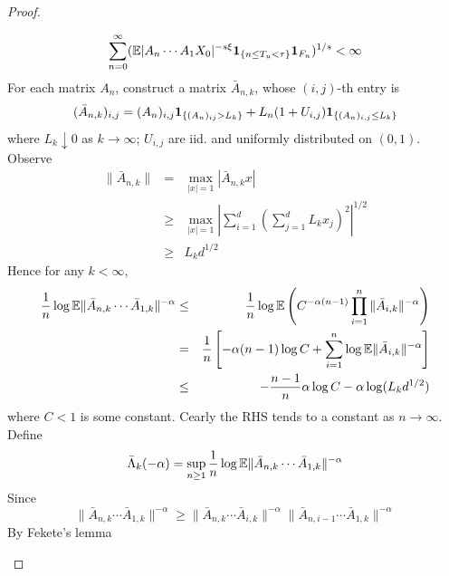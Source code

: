 \documentclass{article}
\theoremstyle{remark}
\begin{document}
\begin{proof}
\begin{enumerate}
    \begin{equation}
      \label{eq:sum_on_F_n}
      \sum_{n=0}^\infty
      (\mathbb{E} |A_n \cdots A_1 X_0|^{-s\xi}\mathbf{1}_{\{n \leq T_u < \tau\}}
      \mathbf{1}_{F_n})^{1/s} < \infty
    \end{equation}
    For each matrix $A_n$, construct a matrix $\bar A_{n, k}$, whose
    $(i,j)$-th entry is
    \begin{equation*}
      (\bar A_{n,k})_{i,j} = (A_n)_{i,j}\mathbf{1}_{\{(A_n)_{ij} > L_k\}} +
      L_n (1 + U_{i,j})\mathbf{1}_{\{(A_n)_{i,j} \leq L_k\}}
    \end{equation*}
    where $L_k \downarrow 0$ as $k \to \infty$; $U_{i,j}$ are
    iid. and uniformly distributed on $(0,1)$.
    Observe
    \begin{eqnarray*}
      \|\bar A_{n,k}\|
      &=&
      \max_{|x| = 1} |\bar A_{n,k} x| \\
      &\geq&
      \max_{|x| = 1}
      \left|
        \sum_{i=1}^d \left(\sum_{j=1}^d L_k x_j \right)^2
      \right|^{1/2} \\
      &\geq& L_k d^{1/2}
    \end{eqnarray*}
    Hence for any $k < \infty$,
    \begin{eqnarray*}
      {1 \over n}
      \log \mathbb{E}
      \|\bar A_{n,k} \cdots \bar A_{1,k}\|^{-\alpha}
      &\leq&
             {1 \over n} \log \mathbb{E} \left(
             C^{-\alpha(n-1)} \prod_{i=1}^n \|\bar A_{i,k}\|^{-\alpha}
             \right) \\
      &=& {1 \over n} \left[
          -\alpha(n-1) \log C
          + \sum_{i=1}^n \log \mathbb{E} \|\bar A_{i,k}\|^{-\alpha}
          \right] \\
      &\leq&
          -{n - 1 \over n} \alpha \log C
          -\alpha \log (L_k d^{1/2})
    \end{eqnarray*}
    where $C < 1$ is some constant. Cearly the RHS tends to a constant
    as $n \to \infty$. Define
    \begin{equation*}
      \bar \Lambda_{k}(-\alpha) = \sup_{n \geq 1} {1 \over n} \log
      \mathbb{E}\|\bar A_{n,k} \cdots \bar A_{1,k}\|^{-\alpha}
    \end{equation*}
    Since
    \begin{equation*}
      \|\bar A_{n,k} \cdots \bar A_{1,k}\|^{-\alpha}
      \geq
      \|\bar A_{n,k} \cdots \bar A_{i,k}\|^{-\alpha}
      \|\bar A_{n,i-1} \cdots \bar A_{1,k}\|^{-\alpha}
    \end{equation*}
    By Fekete's lemma

\end{enumerate}
\end{proof}
\end{document}
